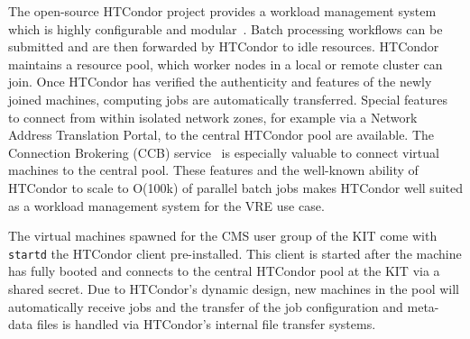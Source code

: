 The open-source HTCondor project provides a workload management system which is highly configurable and modular~\cite{HTCondor}. Batch processing workflows can be submitted and are then forwarded by HTCondor to idle resources. HTCondor maintains a resource pool, which worker nodes in a local or remote cluster can join. Once HTCondor has verified the authenticity and features of the newly joined machines, computing jobs are automatically transferred. Special features to connect from within isolated network zones, for example via a Network Address Translation Portal, to the central HTCondor pool are available. The Connection Brokering (CCB) service~\cite{HTCondorCCB} is especially valuable to connect virtual machines to the central pool. These features and the well-known ability of HTCondor to scale to O(100k) of parallel batch jobs makes HTCondor well suited as a workload management system for the VRE use case.

The virtual machines spawned for the CMS user group of the KIT come with \texttt{startd} the HTCondor client pre-installed. This client is started after the machine has fully booted and connects to the central HTCondor pool at the KIT via a shared secret. Due to HTCondor's dynamic design, new machines in the pool will automatically receive jobs and the transfer of the job configuration and meta-data files is handled via HTCondor's internal file transfer systems.
